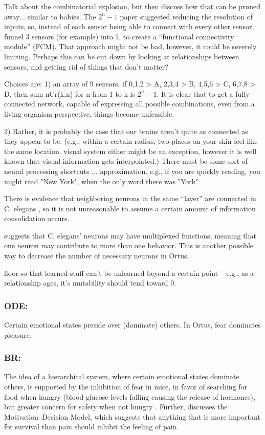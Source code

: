 \documentclass[letterpaper]{article}
\begin{document}
Talk about the combinatorial explosion, but then discuss how that can be pruned away... similar to babies. The $2^n - 1$ paper suggested reducing the resolution of inputs, so, instead of each sensor being able to connect with every other sensor, funnel 3 sensors (for example) into 1, to create a ``functional connectivity module'' (FCM). That approach might not be bad, however, it could be severely limiting. Perhaps this can be cut down by looking at relationships between sensors, and getting rid of things that don't matter?

Choices are:
1) an array of 9 sensors, if 0,1,2 > A, 2,3,4 > B, 4,5,6 > C, 6,7,8 > D, then sum {nCr(k,n)} for n from 1 to k is $2^n - 1$. It is clear that to get a fully connected network, capable of expressing all possible combinations, even from a living organism perspective, things become unfeasible.

2) Rather, it is probably the case that our brains aren't quite as connected as they appear to be. (e.g., within a certain radius, two places on your skin feel like the same location. visual system either might be an exception, however it is well known that visual information gets interpolated.)
There must be some sort of neural processing shortcuts ... approximation. e.g., if you are quickly reading, you might read "New York", when the only word there was "York"

There is evidence that neighboring neurons in the same ``layer'' are connected in C. elegans \citep{Azulay2016}, so it is not unreasonable to assume a certain amount of information consolidation occurs.

\citet{Schroter2017} suggests that C. elegans' neurons may have multiplexed functions, meaning that one neuron may contribute to more than one behavior. This is another possible way to decrease the number of necessary neurons in Ortus.


floor so that learned stuff can't be unlearned beyond a certain point -- e.g., as a relationship ages, it's mutability should tend toward 0.

\subsubsection{ODE:} Certain emotional states preside over (dominate) others. In Ortus, fear dominates pleasure.

\subsubsection{BR:} The idea of a hierarchical system, where certain emotional states dominate others, is supported by the inhibition of fear in mice, in favor of searching for food when hungry (blood glucose levels falling causing the release of hormones), but greater concern for safety when not hungry \citep{Verma2015}. Further, \citet{Leknes2008} discusses the Motivation--Decision Model, which suggests that anything that is more important for survival than pain should inhibit the feeling of pain.
\end{document}
